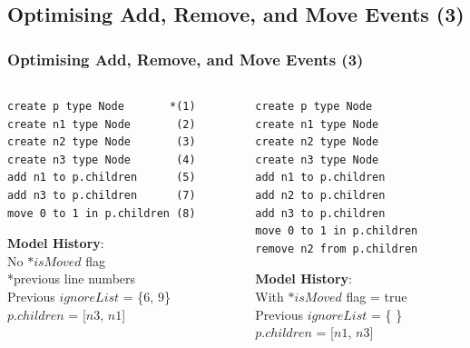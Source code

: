 \documentclass{beamer}
\begin{document}
\begin{frame}[fragile]
\section{Optimising Add, Remove, and Move Events (3)}
\frametitle{Optimising Add, Remove, and Move Events (3)}

\begin{columns}
\begin{column}[t]{0.52\linewidth}
\begin{lstlisting}[style=eol,caption={A replay of the CBP in Listing 6 after naive optimisation (without $*isMoved$ flag).},label=lst:naive_add_remove_move_reference]
create p type Node       *(1) 
create n1 type Node       (2)
create n2 type Node       (3)
create n3 type Node       (4)
add n1 to p.children      (5)
add n3 to p.children      (7) 
move 0 to 1 in p.children (8)
\end{lstlisting}

\begin{footnotesize}
\textbf{Model History}:\\
No $*isMoved$ flag\\
*previous line numbers\\
Previous $ignoreList$ = \{6, 9\}\\
$p$.$children$ = [$n3$, $n1$]
\end{footnotesize}

\end{column}
\begin{column}[t]{0.48\linewidth}
\begin{lstlisting}[style=eol,caption={A replay of the CBP in Listing 6 after optimisation with $*isMoved$ flag.},label=lst:add_remove_move_reference_with_flag]
create p type Node         
create n1 type Node        
create n2 type Node        
create n3 type Node        
add n1 to p.children     
add n2 to p.children     
add n3 to p.children     
move 0 to 1 in p.children
remove n2 from p.children
\end{lstlisting}

\begin{footnotesize}
\textbf{Model History}:\\
With $*isMoved$ flag = true\\
Previous $ignoreList$ = \{ \}\\
$p$.$children$ = [$n1$, $n3$]
\end{footnotesize}

\end{column}
\end{columns}

\end{frame}
\end{document}
